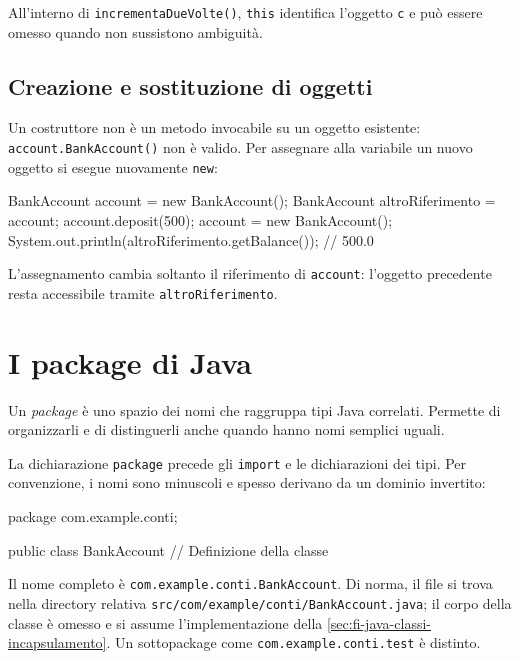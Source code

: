 All'interno di \texttt{incrementaDueVolte()}, \texttt{this}
identifica l'oggetto \texttt{c} e può essere omesso quando
non sussistono ambiguità.

\subsection{Creazione e sostituzione di oggetti}
\label{sec:fi-java-file-ricostruire}

Un costruttore non è un metodo invocabile su un oggetto esistente:
\texttt{account.BankAccount()} non è valido. Per assegnare alla
variabile un nuovo oggetto si esegue nuovamente \texttt{new}:

\begin{unipdcode}[language=Java]
BankAccount account = new BankAccount();
BankAccount altroRiferimento = account;
account.deposit(500);
account = new BankAccount();
System.out.println(altroRiferimento.getBalance()); // 500.0
\end{unipdcode}

L'assegnamento cambia soltanto il riferimento di \texttt{account}:
l'oggetto precedente resta accessibile tramite \texttt{altroRiferimento}.

\section{I package di Java}
\label{sec:fi-java-file-package}

\begin{definition}[Package]
\label{def:fi-java-file-package}
Un \emph{package} è uno spazio dei nomi che raggruppa tipi Java
correlati. Permette di organizzarli e di distinguerli anche quando
hanno nomi semplici uguali.
\end{definition}

La dichiarazione \texttt{package} precede gli \texttt{import} e le
dichiarazioni dei tipi. Per convenzione, i nomi sono minuscoli e
spesso derivano da un dominio invertito:

\begin{unipdcode}[language=Java]
package com.example.conti;

public class BankAccount {
    // Definizione della classe
}
\end{unipdcode}

Il nome completo è \texttt{com.example.conti.BankAccount}. Di
norma, il file si trova nella directory relativa
\texttt{src/com/example/conti/BankAccount.java}; il corpo della
classe è omesso e si assume l'implementazione della
\cref{sec:fi-java-classi-incapsulamento}.
Un sottopackage come \texttt{com.example.conti.test} è distinto.

